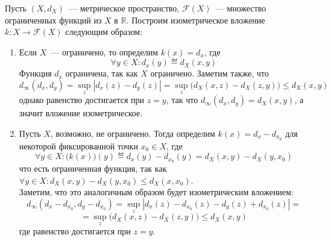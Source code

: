 \documentclass[11pt]{report}
\begin{document}
    \begin{definition}
    Пусть $(X, d_X)$~--- метрическое пространство, $\mathcal{F}(X)$~--- множество ограниченных функций из $X$ в $\mathbb{R}$. Построим изометрическое вложение $k: X \to \mathcal{F}(X)$ следующим образом:
    \begin{enumerate}
        \item Если $X$~--- ограничено, то определим $k(x) = d_x$, где
        \begin{equation*}
            \forall y \in X: d_x(y) \eqdef d_X(x, y)
        \end{equation*}
        Функция $d_x$ ограничена, так как $X$ ограничено. Заметим также, что
        \begin{equation*}
            d_{\infty}(d_x, d_y) = \sup_{z} |d_x(z) - d_y(z)| = \sup_z \big( d_X(x, z) - d_X(z, y) \big) \leq d_X(x, y)
        \end{equation*}
        однако равенство достигается при $z = y$, так что $d_{\infty}(d_x, d_y) = d_X(x, y)$, а значит вложение изометрическое.
        \item Пусть $X$, возможно, не ограничено. Тогда определим $k(x) = d_x - d_{x_0}$ для некоторой фиксированной точки $x_0 \in X$, где
        \begin{equation*}
            \forall y \in X: \big(k(x)\big)(y) \eqdef d_x(y) - d_{x_0}(y) = d_X(x, y) - d_X(y, x_0)
        \end{equation*}
        что есть ограниченная функция, так как $\forall y \in X: d_X(x, y) - d_X(y, x_0) \leq d_X(x, x_0)$. \\
        Заметим, что это аналогичным образом будет изометрическим вложением:
        \begin{equation*}
            d_{\infty}(d_x - d_{x_0}, d_y - d_{x_0}) = \sup_{z} |d_x(z) - d_{x_0}(z) - d_y(z) + d_{x_0}(z)| =
        \end{equation*}
        \begin{equation*}
            = \sup_z \big( d_X(x, z) - d_X(z, y) \big) \leq d_X(x, y)
        \end{equation*}
        где равенство достигается при $z = y$.
    \end{enumerate}
    \end{definition}
\end{document}
